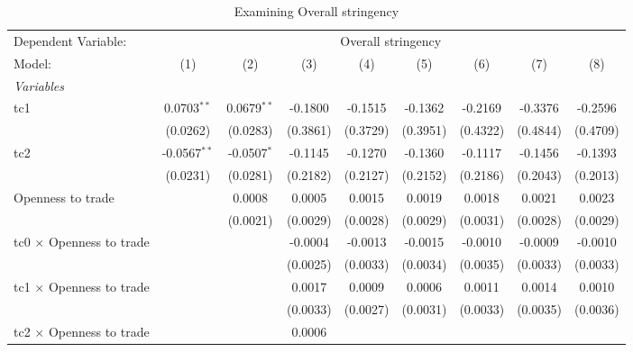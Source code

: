 
\begin{table}[htbp]
   \caption{Examining Overall stringency}
   \centering
   \begin{tabular}{lcccccccc}
      \tabularnewline \midrule \midrule
      Dependent Variable: & \multicolumn{8}{c}{Overall stringency}\\
      Model:                                  & (1)            & (2)           & (3)      & (4)      & (5)      & (6)      & (7)      & (8)\\  
      \midrule
      \emph{Variables}\\
      tc1                                     & 0.0703$^{**}$  & 0.0679$^{**}$ & -0.1800  & -0.1515  & -0.1362  & -0.2169  & -0.3376  & -0.2596\\   
                                              & (0.0262)       & (0.0283)      & (0.3861) & (0.3729) & (0.3951) & (0.4322) & (0.4844) & (0.4709)\\   
      tc2                                     & -0.0567$^{**}$ & -0.0507$^{*}$ & -0.1145  & -0.1270  & -0.1360  & -0.1117  & -0.1456  & -0.1393\\   
                                              & (0.0231)       & (0.0281)      & (0.2182) & (0.2127) & (0.2152) & (0.2186) & (0.2043) & (0.2013)\\   
      Openness to trade                       &                & 0.0008        & 0.0005   & 0.0015   & 0.0019   & 0.0018   & 0.0021   & 0.0023\\   
                                              &                & (0.0021)      & (0.0029) & (0.0028) & (0.0029) & (0.0031) & (0.0028) & (0.0029)\\   
      tc0 $\times$ Openness to trade          &                &               & -0.0004  & -0.0013  & -0.0015  & -0.0010  & -0.0009  & -0.0010\\   
                                              &                &               & (0.0025) & (0.0033) & (0.0034) & (0.0035) & (0.0033) & (0.0033)\\   
      tc1 $\times$ Openness to trade          &                &               & 0.0017   & 0.0009   & 0.0006   & 0.0011   & 0.0014   & 0.0010\\   
                                              &                &               & (0.0033) & (0.0027) & (0.0031) & (0.0033) & (0.0035) & (0.0036)\\   
      tc2 $\times$ Openness to trade          &                &               & 0.0006   &          &          &          &          &   \\   

\end{tabular}
\end{table}
